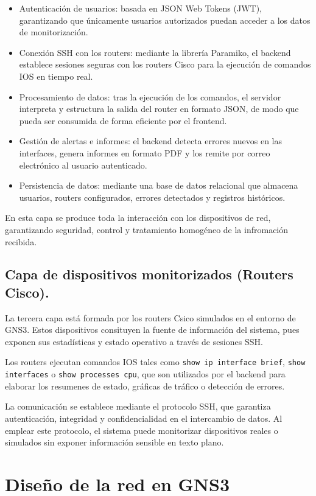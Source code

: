 \begin{itemize}
    \item Autenticación de usuarios: basada en JSON Web Tokens (JWT), garantizando que únicamente usuarios autorizados puedan acceder a los datos de monitorización.
    \item Conexión SSH con los routers: mediante la librería Paramiko, el backend establece sesiones seguras con los routers Cisco para la ejecución de comandos IOS en tiempo real.
    \item Procesamiento de datos: tras la ejecución de los comandos, el servidor interpreta y estructura la salida del router en formato JSON, de modo que pueda ser consumida de forma eficiente por el frontend.
    \item Gestión de alertas e informes: el backend detecta errores nuevos en las interfaces, genera informes en formato PDF y los remite por correo electrónico al usuario autenticado.
    \item Persistencia de datos: mediante una base de datos relacional que almacena usuarios, routers configurados, errores detectados y registros históricos.
\end{itemize}

En esta capa se produce toda la interacción con los dispositivos de red, garantizando seguridad, control y tratamiento homogéneo de la infromación recibida.

\subsection*{Capa de dispositivos monitorizados (Routers Cisco).}

La tercera capa está formada por los routers Csico simulados en el entorno de GNS3. Estos dispositivos consituyen la fuente de información del sistema, pues exponen sus estadísticas y estado operativo a través de sesiones SSH.

Los routers ejecutan comandos IOS tales como \texttt{show ip interface brief}, \texttt{show interfaces} o \texttt{show processes cpu}, que son utilizados por el backend para elaborar los resumenes de estado, gráficas de tráfico o detección de errores.

La comunicación se establece mediante el protocolo SSH, que garantiza autenticación, integridad y confidencialidad en el intercambio de datos. Al emplear este protocolo, el sistema puede monitorizar dispositivos reales o simulados sin exponer información sensible en texto plano.

\section{Diseño de la red en GNS3}


